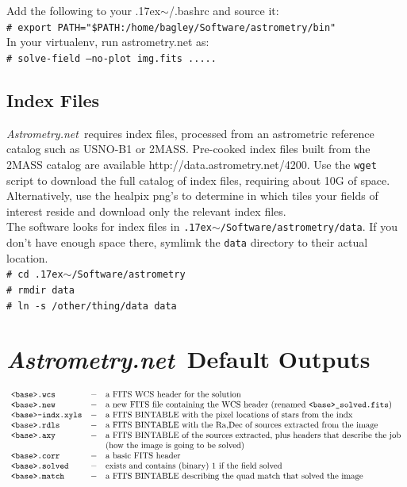 \documentclass{article}
\newcommand{\ttsim}{\raise.17ex\hbox{$\scriptstyle\mathtt{\sim}$}}
\newcommand{\shellcmd}[1]{\indent\indent\texttt{\small\# #1}\\}
\newcommand{\An}{\textit{Astrometry.net}}
\begin{document}
\noindent Add the following to your \ttsim/.bashrc and source it: \\
\shellcmd{export PATH="\$PATH:/home/bagley/Software/astrometry/bin"} 

\noindent In your virtualenv, run astrometry.net as: \\
\shellcmd{solve-field --no-plot img.fits .....}

\subsection{Index Files}
\An~requires index files, processed from an astrometric reference
catalog such as USNO-B1 or 2MASS. Pre-cooked index files built from the 
2MASS catalog are available 
{http://data.astrometry.net/4200}. Use the \texttt{wget} script to download
the full catalog of index files, requiring about 10G of space. Alternatively, 
use the healpix png's to determine in which tiles your fields of interest
reside and download only the relevant index files. \\

\noindent The software looks for index files in 
\texttt{\ttsim/Software/astrometry/data}. If you don't have enough space
there, symlimk the \texttt{data} directory to their actual location. \\
\shellcmd{cd \ttsim/Software/astrometry}
\shellcmd{rmdir data}
\shellcmd{ln -s /other/thing/data data}

\section{\An~Default Outputs}\label{Anoutputs}
\[ \begin{array}{lcl}
\mbox{\texttt{<base>.wcs}} & - & \mbox{a FITS WCS header for the solution} \\
\mbox{\texttt{<base>.new}} & - & \mbox{a new FITS file containing the WCS header (renamed \texttt{<base>\_solved.fits})} \\
\mbox{\texttt{<base>-indx.xyls}} & - & \mbox{a FITS BINTABLE with the pixel locations of stars from the indx} \\
\mbox{\texttt{<base>.rdls}} & - & \mbox{a FITS BINTABLE with the Ra,Dec of sources extracted from the image} \\
\mbox{\texttt{<base>.axy}} & - & \mbox{a FITS BINTABLE of the sources extracted, plus headers that describe the job} \\
\mbox{} & & \mbox{(how the image is going to be solved)} \\
\mbox{\texttt{<base>.corr}} & - & \mbox{a basic FITS header} \\
\mbox{\texttt{<base>.solved}} & - & \mbox{exists and contains (binary) 1 if the field solved} \\
\mbox{\texttt{<base>.match}} & - & \mbox{a FITS BINTABLE describing the quad match that solved the image}
\end{array}\]
\end{document}

